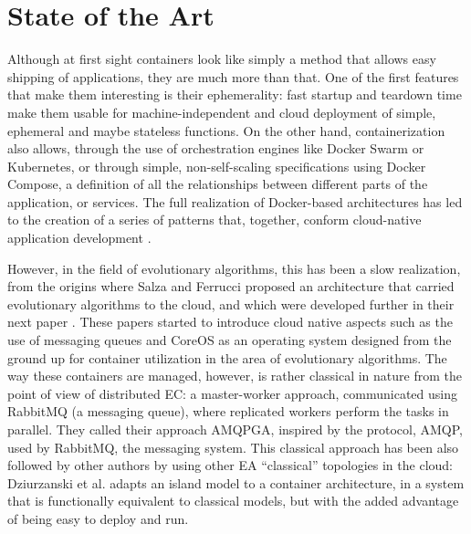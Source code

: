 \documentclass[review]{elsarticle}
\begin{document}
\section{State of the Art} 
\label{soa}

Although at first sight containers look like simply a method that
allows easy shipping of applications, they are much more than
that. One of the first features that make them interesting is their
ephemerality: fast startup and teardown time make them usable for
machine-independent and cloud deployment of simple, ephemeral and
maybe stateless functions. On the other hand, containerization also
allows, through the use of orchestration engines like Docker Swarm or
Kubernetes, or through simple, non-self-scaling specifications using
Docker Compose, a definition of all the relationships between
different parts of the application, or services. The full realization
of Docker-based architectures has led to the creation of a series of
patterns that, together, conform cloud-native application development
\cite{kratzke2017understanding}.

However, in the field of evolutionary algorithms, this has been a slow
realization, from the origins where Salza and Ferrucci
\cite{salza2016approach,salza2016develop} proposed an architecture
that carried evolutionary algorithms to the cloud, and which were
developed further in their next paper \cite{de2017parallel}. These
papers started to introduce cloud native aspects such as the use of
messaging queues and CoreOS as an operating system designed from the
ground up for container utilization in the area of evolutionary
algorithms. The way these containers are managed, however, is rather
classical in nature from the point of view of distributed EC: a
master-worker approach, communicated using RabbitMQ (a messaging
queue), where replicated workers perform the tasks in parallel. They
called their approach AMQPGA, inspired by the protocol, AMQP, used by
RabbitMQ, the messaging system. This classical approach has been also
followed by other authors by using other EA ``classical'' topologies
in the cloud: Dziurzanski et al. \cite{dziurzanski2020scalable} adapts an island model to
a container architecture, in a system that is functionally equivalent
to classical models, but with the added advantage of being easy to
deploy and run.
\end{document}

